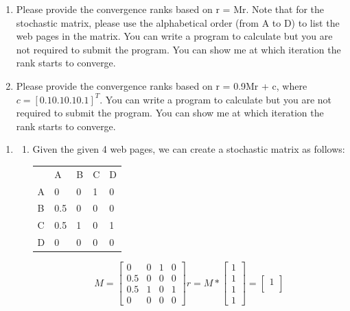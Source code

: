 \documentclass{article}
\begin{document}
\begin{enumerate}[label=(\roman*)]
    \item Please provide the convergence ranks based on r = Mr. Note that for the stochastic matrix, please use the alphabetical order (from A to D) to list the web pages in the matrix. You can write a program to calculate but you are not required to submit the program. You can show me at which iteration the rank starts to converge.
    \item Please provide the convergence ranks based on r = 0.9Mr + c, where $c = [0.1 0.1 0.1 0.1]^T$. You can write a program to calculate but you are not required to submit the program. You can show me at which iteration the rank starts to converge.
\end{enumerate}
\begin{enumerate}[label=(\alph*)]
    \item \begin{enumerate}[label=(\roman*)]
        \item Given the given 4 web pages, we can create a stochastic matrix as follows:
    \begin{table}[h]
        \begin{tabular}{lllll}
          & A       & B & C     & D \\
        A & 0       & 0 & 1     & 0 \\
        B & 0.5     & 0 & 0     & 0 \\
        C & 0.5     & 1 & 0     & 1 \\
        D & 0       & 0 & 0     & 0
        \end{tabular}
        \centering
    \end{table}
    \begin{equation*}
        M = \begin{bmatrix}
            0       & 0 & 1     & 0 \\
            0.5     & 0 & 0     & 0 \\
            0.5     & 1 & 0     & 1 \\
            0       & 0 & 0     & 0
        \end{bmatrix}
        r = M* \begin{bmatrix}
            1 \\
            1 \\
            1 \\
            1
        \end{bmatrix} = 
        \begin{bmatrix}
            1 \\

\end{bmatrix}
\end{equation*}
\end{enumerate}
\end{enumerate}
\end{document}
